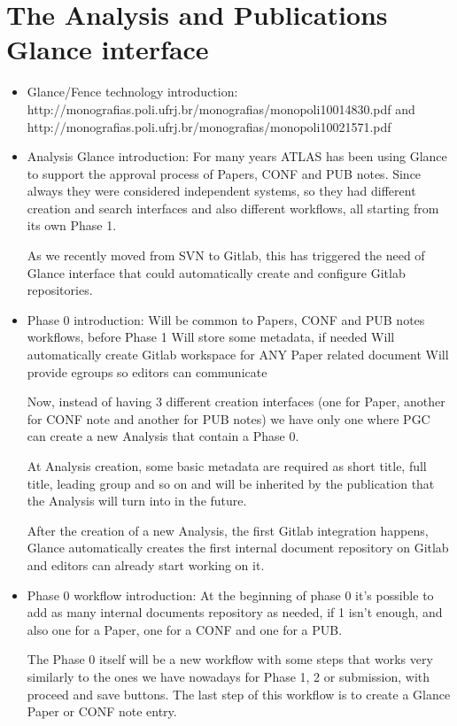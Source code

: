 \documentclass[NOTE, atlasdraft=true, texlive=2016, UKenglish]{\ATLASLATEXPATH atlasdoc}
\begin{document}
\section{The Analysis and Publications Glance interface}%
\label{sec:anaglance}
\begin{itemize}
\item Glance/Fence technology introduction:
http://monografias.poli.ufrj.br/monografias/monopoli10014830.pdf and http://monografias.poli.ufrj.br/monografias/monopoli10021571.pdf

\item Analysis Glance introduction:
For many years ATLAS has been using Glance to support the approval process of Papers, CONF and PUB notes. Since always they were considered independent systems, so they had different creation and search interfaces and also different workflows, all starting from its own Phase 1.

As we recently moved from SVN to Gitlab, this has triggered the need of Glance interface that could automatically create and configure Gitlab repositories.

\item Phase 0 introduction:
Will be common to Papers, CONF and PUB notes workflows, before Phase 1
Will store some metadata, if needed
Will automatically create Gitlab workspace for ANY Paper related document
Will provide egroups so editors can communicate

Now, instead of having 3 different creation interfaces (one for Paper, another for CONF note and another for PUB notes) we have only one where PGC can create a new Analysis that contain a Phase 0.

At Analysis creation, some basic metadata are required as short title, full title, leading group and so on and will be inherited by the publication that the Analysis will turn into in the future.

After the creation of a new Analysis, the first Gitlab integration happens, Glance automatically creates the first internal document repository on Gitlab and editors can already start working on it.

\item Phase 0 workflow introduction:
At the beginning of phase 0 it's possible to add as many internal documents repository as needed, if 1 isn't enough, and also one for a Paper, one for a CONF and one for a PUB.

The Phase 0 itself will be a new workflow with some steps that works very similarly to the ones we have nowadays for Phase 1, 2 or submission, with proceed and save buttons. The last step of this workflow is to create a Glance Paper or CONF note entry.


\end{itemize}
\end{document}
